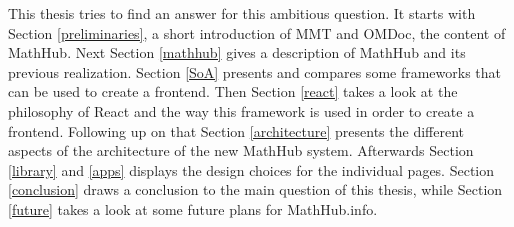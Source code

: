 \documentclass[11pt,a4paper]{article}
\begin{document}
\newline \newline
This thesis tries to find an answer for this ambitious question. It starts with Section \ref{preliminaries}, a short introduction of  MMT and OMDoc, the content of MathHub. 
Next Section \ref{mathhub} gives a description of MathHub and its previous realization.
Section \ref{SoA} presents and compares some frameworks that can be used to create a frontend.
Then Section \ref{react} takes a look at the philosophy of React and the way this framework is used in order to create a frontend.
Following up on that Section \ref{architecture} presents the different aspects of the architecture of the new MathHub system.
Afterwards Section \ref{library} and \ref{apps} displays the design choices for the individual pages.
Section \ref{conclusion} draws a conclusion to the main question of this thesis, while Section \ref{future} takes a look at some future plans for MathHub.info.
\end{document}
